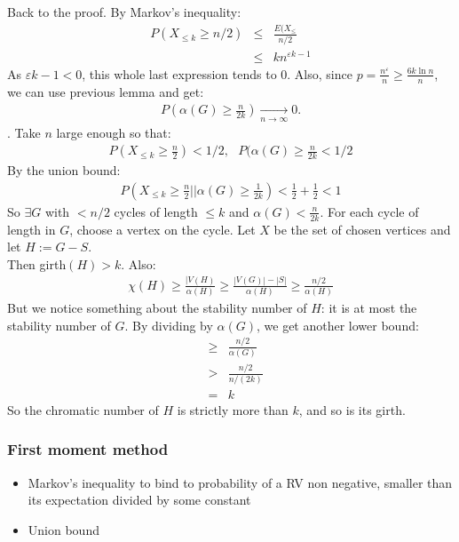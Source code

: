 \documentclass[11pt]{book}
\begin{document}
		
Back to the proof. By Markov's inequality:
\begin{eqnarray}
	P(X_{\leq k} \geq n/2) &\leq& \frac{E(X_{\leq}}{n/2} \\
	&\leq& k n^{\varepsilon k-1}
\end{eqnarray}
As $\varepsilon k-1 <0$, this whole last expression tends to 0. Also, since $p = \frac{n^\varepsilon}{n} \geq \frac{6k \ln n}{n}$, we can use previous lemma and get:
\begin{eqnarray}
	P(\alpha(G) \geq \frac{n}{2k}) \underset{n \rightarrow \infty}{\rightarrow} 0.
\end{eqnarray}.
Take $n$ large enough so that:
\begin{eqnarray}
	P(X_{\leq k} \geq \frac{n}{2}) < 1/2, ~~~
	P(\alpha(G) \geq \frac{n}{2k} < 1/2
\end{eqnarray}
By the union bound:
\begin{eqnarray}
	P(X_{\leq k} \geq \frac{n}{2} || \alpha(G) \geq \frac{1}{2k}) < \frac{1}{2} + \frac{1}{2} < 1
\end{eqnarray}
So $\exists G$ with $<n/2$ cycles of length $\leq k$ and $\alpha(G) < \frac{n}{2k}$. For each cycle of length in $G$, choose a vertex on the cycle. Let $X$ be the set of chosen vertices and let $H := G - S$.\\

Then girth$(H) > k$. Also:
\begin{eqnarray}
	\chi(H) \geq \frac{|V(H)}{\alpha(H)} \geq \frac{|V(G)| - |S|}{\alpha(H)} \geq \frac{n/2}{\alpha(H)}
\end{eqnarray} 
But we notice something about the stability number of $H$: it is at most the stability number of $G$. By dividing by $\alpha(G)$, we get another lower bound:
\begin{eqnarray}
	&\geq& \frac{n/2}{\alpha(G)}\\
	&>& \frac{n/2}{n/(2k)} \\
	&=& k
\end{eqnarray}
So the chromatic number of $H$ is strictly more than $k$, and so is its girth.

\subsubsection{First moment method} 
\begin{itemize}
	\item Markov's inequality to bind to probability of a RV non negative, smaller than its expectation divided by some constant
	\item Union bound	
\end{itemize}
\end{document}
